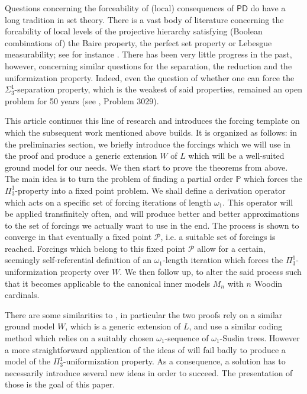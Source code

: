 \documentclass[a4paper,11pt]{article}
\newcommand{\forceP}{\mathbb{P}}
\newcommand{\PD}{\mathsf{PD}}
\begin{document}
Questions concerning the forceability of (local) consequences of $\PD$ do have a long tradition in set theory. There is a vast body of literature concerning the forcability of local levels of the projective hierarchy satisfying (Boolean combinations of) the Baire property, the perfect set property or Lebesgue measurability; see for instance \cite{FS}. There has been very little progress in the past, however, concerning similar questions for the separation, the reduction and the uniformization property. Indeed, even the question of whether one can force the $\Sigma^1_3$-separation property, which is the weakest of said properties, remained an open problem for 50 years (see \cite{Mathias}, Problem 3029).

This article continues this line of research and introduces the forcing template on which the subsequent work mentioned above builds. It is organized as follows: in the preliminaries section, we briefly introduce the forcings which we will use in the proof and produce a generic extension $W$ of $L$ which will be a well-suited ground model for our needs. We then start to prove the theorems from above. The main idea is to turn the problem of finding a partial order $\forceP$ which forces the $\Pi^1_3$-property into a fixed point problem.  We shall define a derivation operator which acts on a specific set of forcing iterations of length $\omega_1$. This operator will be applied transfinitely often, and will produce better and better approximations to the set of forcings we actually want to use in the end. The process is shown to converge in that eventually a fixed point $\mathcal{P}$, i.e. a suitable set of forcings is reached. Forcings which belong to this fixed point $\mathcal{P}$ allow for a certain, seemingly self-referential  definition of an $\omega_1$-length iteration which forces the $\Pi^1_3$-uniformization property over $W$.
We then follow up, to alter the said process such that it becomes applicable to the  canonical inner models $M_n$ with $n$ Woodin cardinals.


There are some similarities to \cite{H}, in particular the two proofs rely on a similar ground model $W$, which is a generic extension of $L$, and use a similar coding method which relies on a suitably chosen $\omega_1$-sequence of $\omega_1$-Suslin trees. However a more straightforward application of the ideas of \cite{H} will fail badly to produce a model of the $\Pi^1_3$-uniformization property. As a consequence, a solution has to necessarily introduce several new ideas in order to succeed. The presentation of those is the goal of this paper.
\end{document}
